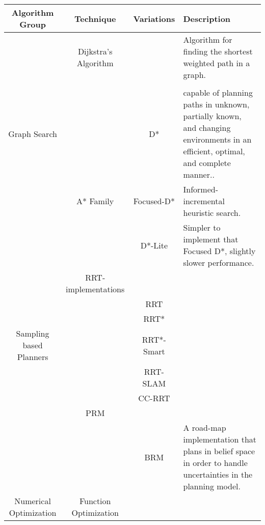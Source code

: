 \documentclass{article}
\begin{document}
\begin{tabular}{c c c p{4em}}
  \hline
  \hline
  Algorithm Group & Technique & Variations & Description \\
  \hline
                  &  Dijkstra's Algorithm & &Algorithm for finding the shortest weighted path in a graph.\\
                  &  \\
  Graph Search               & & D* & capable of planning paths in unknown, partially known, and changing environments in an efficient, optimal, and complete manner..\\
                  & A* Family & Focused-D* & Informed-incremental heuristic search.\\
                  & & D*-Lite & Simpler to implement that Focused D*, slightly slower performance.\\
  \hline
                  & RRT-implementations \\
                  & & RRT\\
                  & & RRT*\\
  Sampling based Planners& & RRT*-Smart\\
                  & & RRT-SLAM\\
                  & & CC-RRT\\
                  & PRM \\
                  & & BRM & A road-map implementation that plans in belief space in order to handle uncertainties in the planning model.\\
  \hline
  Numerical Optimization &  Function Optimization \\
  \hline
\end{tabular} 
\end{document}
